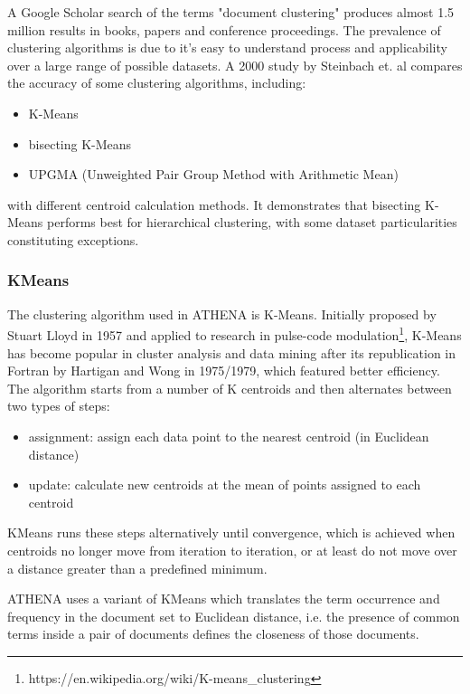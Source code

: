 A Google Scholar search of the terms "document clustering" produces almost 1.5 million results in books, papers and conference proceedings. The prevalence of clustering algorithms is due to it's easy to understand process and applicability over a large range of possible datasets. A 2000 study by Steinbach et. al \cite{steinbach2000comparison} compares the accuracy of some clustering algorithms, including:

\begin{itemize}
\item K-Means
\item bisecting K-Means
\item UPGMA (Unweighted Pair Group Method with Arithmetic Mean)
\end{itemize}

with different centroid calculation methods. It demonstrates that bisecting K-Means performs best for hierarchical clustering, with some dataset particularities constituting exceptions.

\subsubsection{KMeans}
The clustering algorithm used in ATHENA is K-Means. Initially proposed by Stuart Lloyd in 1957 and applied to research in pulse-code modulation\footnote{https://en.wikipedia.org/wiki/K-means\_clustering}, K-Means has become popular in cluster analysis and data mining after its republication in Fortran by Hartigan and Wong in 1975/1979, which featured better efficiency. The algorithm starts from a number of K centroids and then alternates between two types of steps:

\begin{itemize}
\item assignment: assign each data point to the nearest centroid (in Euclidean distance)
\item update: calculate new centroids at the mean of points assigned to each centroid
\end{itemize}

KMeans runs these steps alternatively until convergence, which is achieved when centroids no longer move from iteration to iteration, or at least do not move over a distance greater than a predefined minimum.

ATHENA uses a variant of KMeans which translates the term occurrence and frequency in the document set to Euclidean distance, i.e. the presence of common terms inside a pair of documents defines the closeness of those documents.

